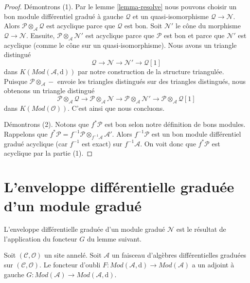 \begin{proof}
Démontrons (1). Par le lemme \ref{lemma-resolve} nous pouvons choisir
un bon module différentiel gradué à gauche $\mathcal{Q}$ et un
quasi-isomorphisme $\mathcal{Q} \to \mathcal{N}$.
Alors $\mathcal{P} \otimes_\mathcal{A} \mathcal{Q}$
est acyclique parce que $\mathcal{Q}$
est bon. Soit $\mathcal{N}'$ le cône du
morphisme $\mathcal{Q} \to \mathcal{N}$.
Ensuite, $\mathcal{P} \otimes_\mathcal{A} \mathcal{N}'$ est acyclique
parce que $\mathcal{P}$ est bon et parce que $\mathcal{N}'$ est
acyclique (comme le cône sur un quasi-isomorphisme). Nous avons un
triangle
distingué $$
\mathcal{Q} \to \mathcal{N} \to \mathcal{N}' \to \mathcal{Q}[1]
$$
dans $K(\textit{Mod}(\mathcal{A}, \text{d}))$ par notre
construction de la structure triangulée. Puisque
$\mathcal{P} \otimes_\mathcal{A} -$ envoie les triangles
distingués sur des triangles distingués, nous obtenons un triangle
distingué
$$
\mathcal{P} \otimes_\mathcal{A} \mathcal{Q} \to
\mathcal{P} \otimes_\mathcal{A} \mathcal{N} \to
\mathcal{P} \otimes_\mathcal{A} \mathcal{N}' \to
\mathcal{P} \otimes_\mathcal{A} \mathcal{Q}[1]
$$ dans
$K(\textit{Mod}(\mathcal{O}))$. C'est ainsi que nous concluons.

\medskip\noindent
Démontrons (2). Notons que $f^*\mathcal{P}$ est bon selon notre définition de
bons modules. Rappelons
que $f^*\mathcal{P} = f^{-1}\mathcal{P} \otimes_{f^{-1}\mathcal{A}} \mathcal{A}'$.
Alors $f^{-1}\mathcal{P}$ est un bon module différentiel gradué acyclique (car $f^{-1}$
est exact) sur $f^{-1}\mathcal{A}$. On voit donc
que $f^*\mathcal{P}$ est acyclique par la partie (1).
\end{proof}






\section{L'enveloppe différentielle graduée d'un module gradué}
\label{section-dg-hull}

\noindent
L'enveloppe différentielle graduée d'un module gradué $\mathcal{N}$
est le résultat de l'application du foncteur $G$ du lemme suivant.

\begin{lemma}
\label{lemma-dg-hull}
Soit $(\mathcal{C}, \mathcal{O})$ un site annelé.
Soit $\mathcal{A}$ un faisceau d'algèbres différentielles graduées
sur $(\mathcal{C}, \mathcal{O})$. Le foncteur d'oubli
$F : \textit{Mod}(\mathcal{A}, \text{d}) \to \textit{Mod}(\mathcal{A})$ a
un adjoint à gauche $G : \textit{Mod}(\mathcal{A}) \to
\textit{Mod}(\mathcal{A}, \text{d})$.
\end{lemma}

